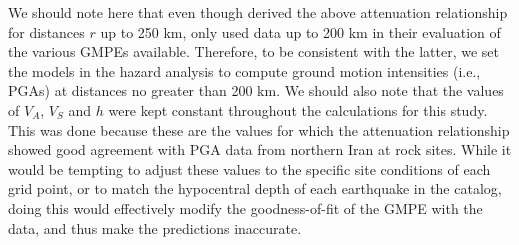 We should note here that even though \citet{Kalkan2004} derived the above attenuation relationship for distances $r$ up to 250 km, \citet{Zafarani2014} only used data up to 200 km in their evaluation of the various GMPEs available. Therefore, to be consistent with the latter, we set the models in the hazard analysis to compute ground motion intensities (i.e., PGAs) at distances no greater than 200 km. We should also note that the values of $V_A$, $V_S$ and $h$ were kept constant throughout the calculations for this study. This was done because these are the values for which the attenuation relationship showed good agreement with PGA data from northern Iran at rock sites. While it would be tempting to adjust these values to the specific site conditions of each grid point, or to match the hypocentral depth of each earthquake in the catalog, doing this would effectively modify the goodness-of-fit of the GMPE with the data, and thus make the predictions inaccurate.
